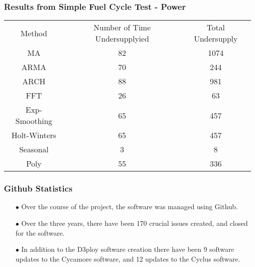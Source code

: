 \begin{frame}
  \frametitle{Results from Simple Fuel Cycle Test - Power}
        \begin{tabular}{c c c}
        Method & Number of Time Undersupplyied & Total Undersupply \\
        MA & 82 & 1074 \\
        ARMA& 70 & 244 \\
        ARCH & 88 & 981 \\
        FFT & 26 & 63 \\
        Exp-Smoothing & 65 & 457 \\
        Holt-Winters & 65 & 457 \\
        Seasonal & 3 & 8 \\
        Poly & 55 & 336
        \end{tabular}
\end{frame}

\begin{frame}
  \frametitle{Github Statistics}
        \begin{itemize}
    \item[$\bullet$] Over the course of the project, the software was 
                    managed using Github.
    \item[$\bullet$] Over the three years, there have been 170 crucial
                     issues created, and closed for the software. 
    \item[$\bullet$] In addition to the D3ploy software creation there
                     have been 9 software updates to the Cycamore software,
                     and 12 updates to the Cyclus software.             
        \end{itemize}
\end{frame}
